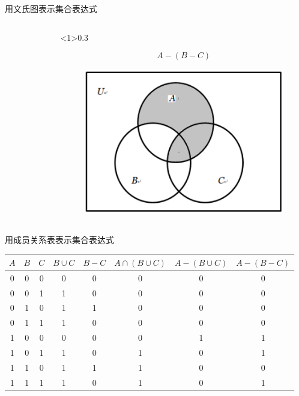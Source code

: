 \documentclass[xetex,10pt,aspectratio=43]{beamer}
\begin{document}
\begin{frame}{用文氏图表示集合表达式}
\begin{columns}
\begin{column}
\begin{figure}
			\end{figure}	
			
		\end{column}
	
		\begin{column}<1>{0.3\textwidth}
		
			$$A-(B-C)$$
			
			\begin{figure}
				
				\centering
				
				\includegraphics[scale=0.5]{21.png}
				
			\end{figure}	
			
		\end{column}
		
	\end{columns}

	\end{frame}

	\begin{frame}{用成员关系表表示集合表达式}
	
		\begin{table}
			
			\centering
			
			\begin{tabular}{|c|c|c|c|c|c|c|c|}
				\hline
				$A$ & $B$ & $C$ & $B\cup C$ & $B-C$ & $A\cap(B\cup C)$ & $A-(B\cup C)$ & $A-(B-C)$\\
				\hline
				0 & 0 & 0 & 0 & 0 & 0 & 0 & 0\\
				\hline
				0 & 0 & 1 & 1 & 0 & 0 & 0 & 0\\
				\hline
				0 & 1 & 0 & 1 & 1 & 0 & 0 & 0\\
				\hline
				0 & 1 & 1 & 1 & 0 & 0 & 0 & 0\\
				\hline
				1 & 0 & 0 & 0 & 0 & 0 & 1 & 1\\
				\hline
				1 & 0 & 1 & 1 & 0 & 1 & 0 & 1\\
				\hline
				1 & 1 & 0 & 1 & 1 & 1 & 0 & 0\\
				\hline
				1 & 1 & 1 & 1 & 0 & 1 & 0 & 1\\
				\hline
			\end{tabular}
			
		\end{table}	

	\end{frame}
\end{document}
